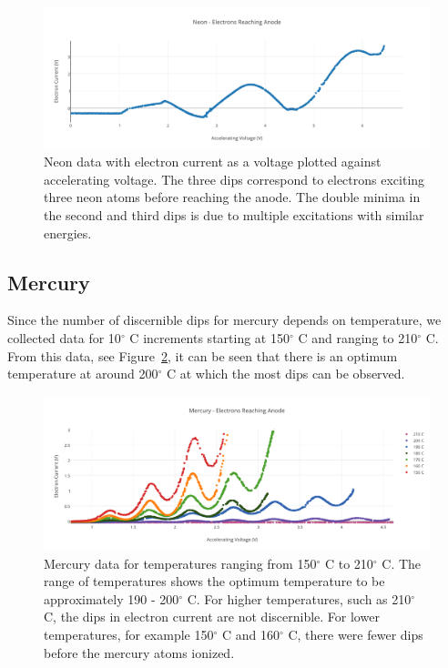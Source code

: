 \documentclass[prb,preprint]{revtex4-1}
\begin{document}
\begin{figure}[h!]
\centering

\includegraphics[width=6in]{neon_data.pdf}
\caption{Neon data with electron current as a voltage plotted against accelerating voltage. The three dips correspond to electrons exciting three neon atoms before reaching the anode. The double minima in the second and third dips is due to multiple excitations with similar energies.}

\label{neon_data}
\end{figure}


\subsection{Mercury}

Since the number of discernible dips for mercury depends on temperature, we collected data for 10$^{\circ}$ C increments starting at 150$^{\circ}$ C and ranging to 210$^{\circ}$ C. From this data, see Figure~\ref{hg_data}, it can be seen that there is an optimum temperature at around 200$^{\circ}$ C at which the most dips can be observed. 

\begin{figure}[h!]
\centering

\includegraphics[width=6in]{hg_data.pdf}
\caption{Mercury data for temperatures ranging from 150$^{\circ}$ C to 210$^{\circ}$ C. The range of temperatures shows the optimum temperature to be approximately 190 - 200$^{\circ}$ C. For higher temperatures, such as 210$^{\circ}$ C, the dips in electron current are not discernible. For lower temperatures, for example 150$^{\circ}$ C and 160$^{\circ}$ C, there were fewer dips before the mercury atoms ionized.}

\label{hg_data}
\end{figure}
\end{document}
